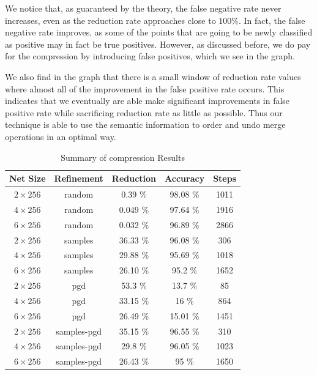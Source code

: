 We notice that, as guaranteed by the theory, the false negative rate never
increases, even as the reduction rate approaches close to $100\%$. In fact, the
false negative rate improves, as some of the points that are going
to be newly classified as positive may in fact be true positives.  
However, as discussed before, we do pay for the compression by introducing false
positives, which we see in the graph. 

We also find in the graph that there is a
small window of reduction rate values where almost all of the improvement in the
false positive rate occurs. This indicates that we eventually are able make 
significant improvements in false positive rate while sacrificing reduction rate
as little as possible. Thus our technique is able to use the semantic
information to order and undo merge operations in an optimal way.

\begin{table}
\begin{tabular}{|c|c|c|c|c|}
\hline
Net Size     & Refinement  & Reduction & Accuracy & Steps  \\ 
\hline
$2\times256$ & random      & 0.39   \%  &  98.08 \%  &   1011 \\ 
$4\times256$ & random      & 0.049   \%   & 97.64  \%  &   1916 \\ 
$6\times256$ & random      & 0.032   \%   & 96.89 \%  &   2866 \\ 
$2\times256$ & samples     & 36.33 \%   & 96.08 \%  &     306 \\ 
$4\times256$ & samples     & 29.88 \%   & 95.69 \%  &   1018 \\ 
$6\times256$ & samples     & 26.10 \%   & 95.2 \%  &   1652 \\ 
$2\times256$ & pgd         & 53.3 \%   & 13.7 \%  &     85 \\ 
$4\times256$ & pgd         & 33.15 \%   & 16 \%  &      864 \\ 
$6\times256$ & pgd         & 26.49 \%   & 15.01 \%  &   1451 \\ 
$2\times256$ & samples-pgd & 35.15 \%   & 96.55 \%  &    310 \\ 
$4\times256$ & samples-pgd & 29.8 \%   & 96.05 \%  &   1023 \\ 
$6\times256$ & samples-pgd & 26.43 \%   & 95 \%  &   1650 \\ 
\hline
\end{tabular}
\caption{Summary of \mnist compression Results}
\label{t:mnist-compr-summary}
\end{table}

